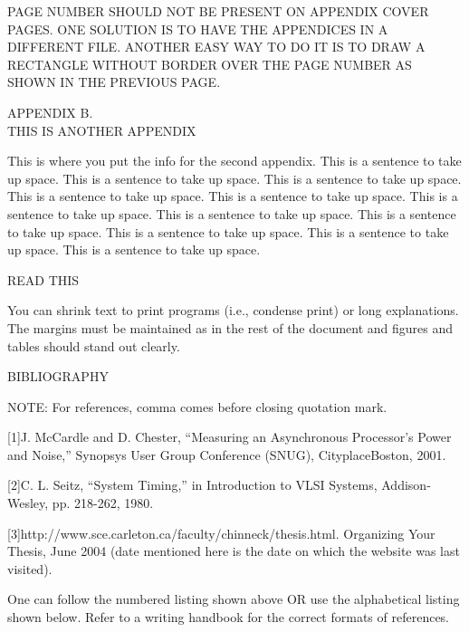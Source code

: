 \documentclass{article}
\newcommand{\tab}{\hspace{5mm}}
\begin{document}
PAGE NUMBER SHOULD NOT BE PRESENT ON APPENDIX COVER PAGES. ONE 
SOLUTION IS TO HAVE THE APPENDICES IN A DIFFERENT FILE.  ANOTHER 
EASY WAY TO DO IT IS TO DRAW A RECTANGLE WITHOUT BORDER OVER THE 
PAGE NUMBER AS SHOWN IN THE PREVIOUS PAGE.

\newpage

\begin{center}
APPENDIX B.\\
THIS IS ANOTHER APPENDIX


\end{center}

\newpage
This is where you put the info for the second appendix. This 
is a sentence to take up space. This is a sentence to take up 
space. This is a sentence to take up space. This is a sentence 
to take up space. This is a sentence to take up space. This is 
a sentence to take up space. This is a sentence to take up space. 
This is a sentence to take up space. This is a sentence to take 
up space. This is a sentence to take up space. This is a sentence 
to take up space. 


READ THIS

You can shrink text to print programs (i.e., condense print) 
or long explanations. The margins must be maintained as in the 
rest of the document and figures and tables should stand out clearly.

\newpage

\begin{center}
BIBLIOGRAPHY


\end{center}


NOTE:  For references, comma comes before closing quotation mark.

[1]\tab \tab J. McCardle and D. Chester, ``Measuring an Asynchronous Processor's 
Power  \\
and Noise,'' Synopsys User Group Conference (SNUG), CityplaceBoston, 
2001.



[2]\tab \tab \tab C. L. Seitz, ``System Timing,'' in Introduction to VLSI Systems, 
Addison-Wesley, pp. 218-262, 1980.

[3]\tab \tab \tab http://www.sce.carleton.ca/faculty/chinneck/thesis.html. Organizing Your Thesis, June 2004 (date mentioned here is the 
date on which the website was last visited).


One can follow the numbered listing shown above OR use the alphabetical 
listing shown below. Refer to a writing handbook for the correct 
formats of references. 
\end{document}
